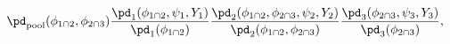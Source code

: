 \begin{equation}
  \pd_{\text{pool}}(\phi_{1 \cap 2}, \phi_{2 \cap 3})
  \frac {
    \pd_{1} (\phi_{1 \cap 2}, \psi_{1}, Y_{1})
  } {
    \pd_{1}(\phi_{1 \cap 2})
  }
  \frac {
    \pd_{2} (\phi_{1 \cap 2}, \phi_{2 \cap 3}, \psi_{2}, Y_{2})
  } {
    \pd_{2}(\phi_{1 \cap 2}, \phi_{2 \cap 3})
  }
  \frac {
    \pd_{3} (\phi_{2 \cap 3}, \psi_{3}, Y_{3})
  } {
    \pd_{3}(\phi_{2 \cap 3})
  },
  \label{eqn:melded-model}
\end{equation}